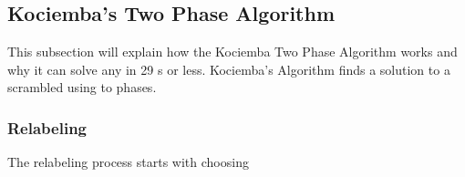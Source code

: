 \subsection{Kociemba's Two Phase Algorithm}
This subsection will explain how the Kociemba Two Phase Algorithm works and why it can solve any \rubik{} in 29 \twist{}s or less. Kociemba's Algorithm finds a solution to a scrambled \rubik{} using to phases.

\subsubsection{Relabeling}
The relabeling process  starts with choosing 